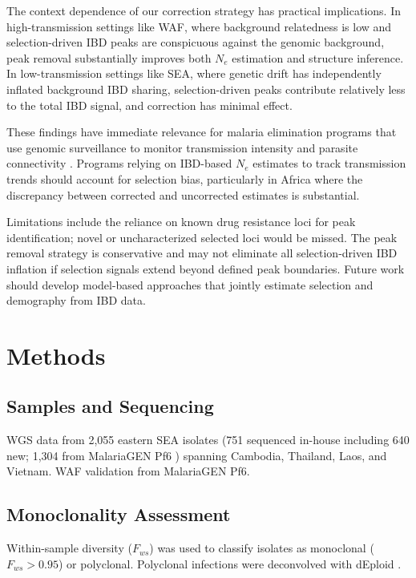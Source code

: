 \documentclass[11pt]{article}
\begin{document}
The context dependence of our correction strategy has practical implications. In high-transmission settings like WAF, where background relatedness is low and selection-driven IBD peaks are conspicuous against the genomic background, peak removal substantially improves both $N_e$ estimation and structure inference. In low-transmission settings like SEA, where genetic drift has independently inflated background IBD sharing, selection-driven peaks contribute relatively less to the total IBD signal, and correction has minimal effect.

These findings have immediate relevance for malaria elimination programs that use genomic surveillance to monitor transmission intensity and parasite connectivity \citep{who2022malaria}. Programs relying on IBD-based $N_e$ estimates to track transmission trends should account for selection bias, particularly in Africa where the discrepancy between corrected and uncorrected estimates is substantial.

Limitations include the reliance on known drug resistance loci for peak identification; novel or uncharacterized selected loci would be missed. The peak removal strategy is conservative and may not eliminate all selection-driven IBD inflation if selection signals extend beyond defined peak boundaries. Future work should develop model-based approaches that jointly estimate selection and demography from IBD data.

\section{Methods}

\subsection{Samples and Sequencing}
WGS data from 2,055 eastern SEA isolates (751 sequenced in-house including 640 new; 1,304 from MalariaGEN Pf6 \citep{malariagen2021pf7}) spanning Cambodia, Thailand, Laos, and Vietnam. WAF validation from MalariaGEN Pf6.

\subsection{Monoclonality Assessment}
Within-sample diversity ($F_{ws}$) \citep{manske2012analysis} was used to classify isolates as monoclonal ($F_{ws} > 0.95$) or polyclonal. Polyclonal infections were deconvolved with dEploid \citep{zhu2017deploid}.
\end{document}
